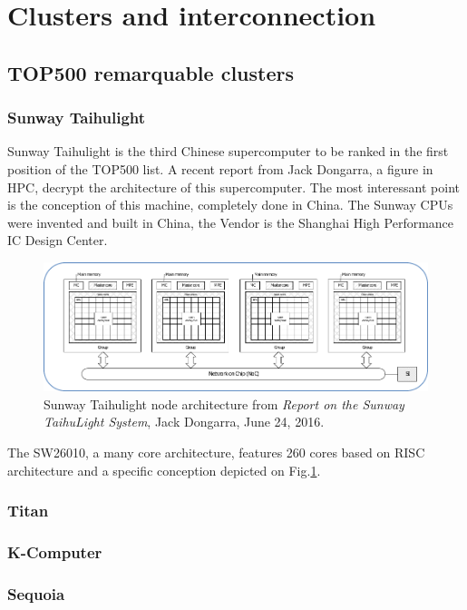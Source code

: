 \section{Clusters and interconnection}
\subsection{TOP500 remarquable clusters}
\subsubsection{Sunway Taihulight}

Sunway Taihulight is the third Chinese supercomputer to be ranked in the first position of the TOP500 list. 
A recent report from Jack Dongarra, a figure in HPC, decrypt the architecture of this supercomputer\cite{dongarra2016report}. 
The most interessant point is the conception of this machine, completely done in China. 
The Sunway CPUs were invented and built in China, the Vendor is the Shanghai High Performance IC Design Center. 

\begin{figure}
\centering
\includegraphics[scale=1]{figures/Chap1/report_sunway_CPE}
\caption{Sunway Taihulight node architecture from \textit{Report on the Sunway TaihuLight System}, Jack Dongarra, June 24, 2016.}
\label{fig:chap1_report_sunway_CPE}
\end{figure}

The SW26010, a many core architecture, features 260 cores based on RISC architecture and a specific conception depicted on Fig.\ref{fig:chap1_report_sunway_CPE}.


\subsubsection{Titan}
\subsubsection{K-Computer}
\subsubsection{Sequoia}
